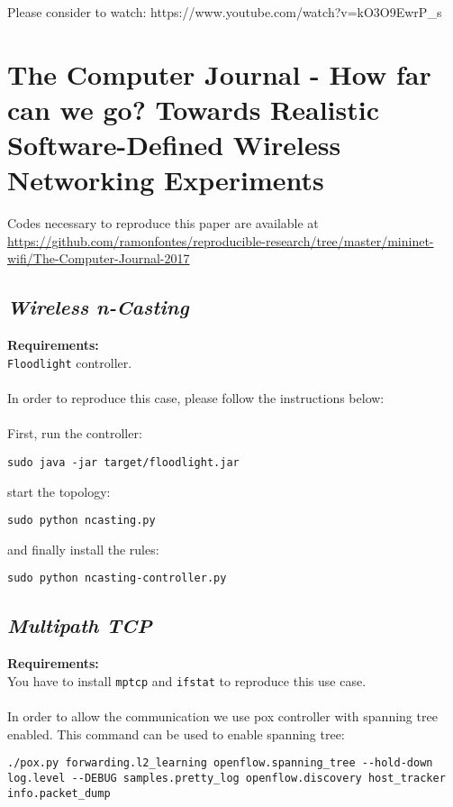 \noindent Please consider to watch: https://www.youtube.com/watch?v=kO3O9EwrP\_s

\section{The Computer Journal - How far can we go? Towards
Realistic Software-Defined Wireless
Networking Experiments}

Codes necessary to reproduce this paper are available at \url{https://github.com/ramonfontes/reproducible-research/tree/master/mininet-wifi/The-Computer-Journal-2017}

\subsection{\textit{Wireless n-Casting}}
\textbf{Requirements:\\}
\texttt{Floodlight} controller.
\\
\\
In order to reproduce this case, please follow the instructions below:
\\
\\
First, run the controller:
\begin{verbatim}
sudo java -jar target/floodlight.jar
\end{verbatim}


\noindent start the topology:
\begin{verbatim}
sudo python ncasting.py
\end{verbatim}

\noindent and finally install the rules:
\begin{verbatim}
sudo python ncasting-controller.py
\end{verbatim}

\subsection{\textit{Multipath TCP}}
\textbf{Requirements:\\}
You have to install \texttt{mptcp} and \texttt{ifstat} to reproduce this use case. \\
\\
In order to allow the communication we use pox controller with spanning tree enabled. This command can be used to enable spanning tree:
\begin{verbatim}
./pox.py forwarding.l2_learning openflow.spanning_tree --hold-down log.level --DEBUG samples.pretty_log openflow.discovery host_tracker info.packet_dump
\end{verbatim}

